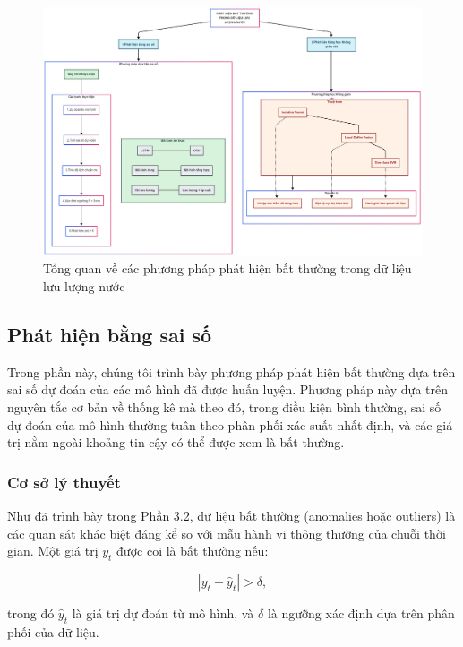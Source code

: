 \begin{figure}[H]
    \centering
    \includegraphics[width=\textwidth]{image/section6_1/luoc_do_phat_hien_bat_thuong.png}
    \caption{Tổng quan về các phương pháp phát hiện bất thường trong dữ liệu lưu lượng nước}
    \label{fig:overview_anomaly_detection}
\end{figure}

\subsection{Phát hiện bằng sai số}
Trong phần này, chúng tôi trình bày phương pháp phát hiện bất thường dựa trên sai số dự đoán của các mô hình đã được huấn luyện. Phương pháp này dựa trên nguyên tắc cơ bản về thống kê mà theo đó, trong điều kiện bình thường, sai số dự đoán của mô hình thường tuân theo phân phối xác suất nhất định, và các giá trị nằm ngoài khoảng tin cậy có thể được xem là bất thường.

\subsubsection{Cơ sở lý thuyết}
Như đã trình bày trong Phần 3.2, dữ liệu bất thường (anomalies hoặc outliers) là các quan sát khác biệt đáng kể so với mẫu hành vi thông thường của chuỗi thời gian. Một giá trị \( y_t \) được coi là bất thường nếu:

\begin{equation}
    |y_t - \hat{y}_t| > \delta,
\end{equation}

trong đó \(\hat{y}_t\) là giá trị dự đoán từ mô hình, và \(\delta\) là ngưỡng xác định dựa trên phân phối của dữ liệu.

